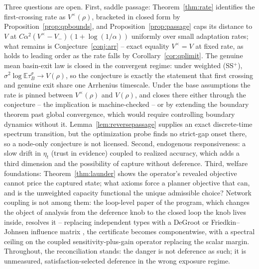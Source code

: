 \documentclass[11pt]{article}
\theoremstyle{definition}
\theoremstyle{remark}
\numberwithin{equation}{section}
\begin{document}
Three questions are open. First, saddle passage: Theorem~\ref{thm:rate} identifies the first-crossing rate as $V^{\times}(\rho)$, bracketed in closed form by Proposition~\ref{prop:qpbounds}, and Proposition~\ref{prop:passage} caps its distance to $V$ at $C\alpha^2(V^{\times}-V_-)(1+\log(1/\alpha))$ uniformly over small adaptation rates; what remains is Conjecture~\ref{conj:arr} -- exact equality $V^{\times}=V$ at fixed rate, as holds to leading order as the rate falls by Corollary~\ref{cor:qplimit}. The genuine mean basin-exit law is closed in the convergent regime: under weighted (SS$^+$), $\sigma^2\log\mathbb E\tau_B^\sigma\to V(\rho)$, so the conjecture is exactly the statement that first crossing and genuine exit share one Arrhenius timescale. Under the base assumptions the rate is pinned between $V^{\times}(\rho)$ and $V(\rho)$, and closes there either through the conjecture -- the implication is machine-checked -- or by extending the boundary theorem past global convergence, which would require controlling boundary dynamics without it. Lemma~\ref{lem:reversepassage} supplies an exact discrete-time spectrum transition, but the optimization probe finds no strict-gap onset there, so a node-only conjecture is not licensed. Second, endogenous responsiveness: a slow drift in $\eta_t$ (trust in evidence) coupled to realized accuracy, which adds a third dimension and the possibility of capture without deference. Third, welfare foundations: Theorem~\ref{thm:launder} shows the operator's revealed objective cannot price the captured state; what axioms force a planner objective that can, and is the unweighted capacity functional the unique admissible choice? Network coupling is not among them: the loop-level paper of the program, which changes the object of analysis from the deference knob to the closed loop the knob lives inside, resolves it \citep{hofheinz2026loops} -- replacing independent types with a DeGroot or Friedkin--Johnsen influence matrix \citep{degroot1974reaching,friedkin1990social,golub2010naive}, the certificate becomes componentwise, with a spectral ceiling on the coupled sensitivity-plus-gain operator replacing the scalar margin. Throughout, the reconciliation stands: the danger is not deference as such; it is unmeasured, satisfaction-selected deference in the wrong exposure regime.
\end{document}
